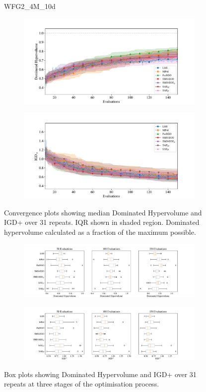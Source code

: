 \documentclass[conference]{IEEEtran}
\begin{document}
\clearpage

\begin{figure}
WFG2\_4M\_10d


\begin{subfigure}[hbt!]{\linewidth}

    \centering
    \includegraphics[width=0.7\linewidth]{figures/wfg2_4obj_10dim_hv_plot.pdf}
\end{subfigure}
\begin{subfigure}[h]{\linewidth}
    \centering
    \includegraphics[width=0.7\linewidth]{figures/wfg2_4obj_10dim_igd_plot.pdf}
\end{subfigure}
    \caption{Convergence plots showing median Dominated Hypervolume and IGD+ over 31 repeats. IQR shown in shaded region. Dominated hypervolume calculated as a fraction of the maximum possible.}
\vspace{\floatsep}
\begin{subfigure}[t]{\linewidth}
    \centering
    \includegraphics[width=0.8\linewidth]{figures/wfg2_4obj_10dim_hv_boxplot.pdf}
\end{subfigure}
\begin{subfigure}[t]{\linewidth}
    \centering
    \includegraphics[width=0.8\linewidth]{figures/wfg2_4obj_10dim_igd_boxplot.pdf}
\end{subfigure}
    \caption{Box plots showing Dominated Hypervolume and IGD+ over 31 repeats at three stages of the optimisation process.}
\end{figure}
\clearpage
\end{document}
